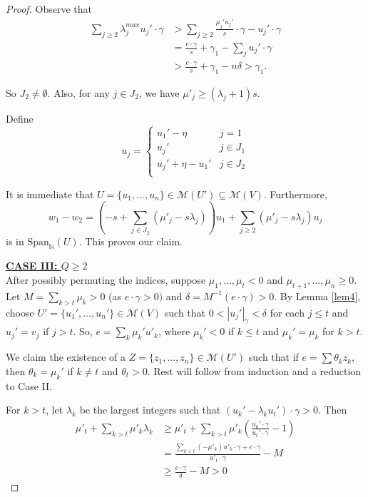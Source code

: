 \documentclass[10pt,a4paper]{amsart}
\newcommand{\N}{\mathbb{N}}
\newcommand{\cM}{\mathcal{M}}
\begin{document}
\begin{proof}
Observe that 
\begin{align*}
\sum_{j\geq 2} \lambda_j^{max}u_j'\cdot \gamma
    &> \sum_{j\geq 2} \frac{\mu_j'u_j'}{s}\cdot \gamma - u_j'\cdot \gamma \\
    &= \frac{e\cdot \gamma}{s} + \gamma_1 - \sum_j u_j'\cdot \gamma \\
    &> \frac{e\cdot \gamma}{s} + \gamma_1 - n\delta > \gamma_1.
\end{align*}

So $J_2\neq \emptyset$. Also, for any $j\in J_2$, we have $\mu'_j \geq (\lambda_j+1)s$.

Define
$$u_j = \begin{cases}
    u_1' -\eta & j=1 \\
    u_j' & j\in J_1\\
    u_j'+\eta - u_1' & j\in J_2 \\
\end{cases}$$

It is immediate that $U =\{u_1,\ldots, u_n\} \in \cM(U')\subseteq \cM(V)$. Furthermore, 
$$w_1 - w_2 = \left(-s+\sum_{j\in J_2} (\mu'_j  - s\lambda_j)\right)  u_1 +\sum_{j\geq 2} (\mu'_j  - s\lambda_j)u_j$$
is in $\mathrm{Span}_\N(U)$. This proves our claim.

\underline{\textbf{CASE III: $Q\geq 2$}} \\
After possibly permuting the indices, suppose $\mu_1,\ldots, \mu_t<0$ and $\mu_{t+1},\ldots, \mu_n\geq 0$. Let $M=\sum_{k>t}\mu_k>0$ (as $e\cdot \gamma>0)$ and $\delta = {M}^{-1}(e\cdot \gamma)>0$. By Lemma \ref{lem4}, choose $U'=\{u_1',\ldots,u_n'\}\in \cM(V)$ such that $0<|u_j'|_\gamma<\delta$ for each $j\leq t$ and $u_j'=v_j$ if $j>t$. So, $e = \sum_k \mu_k'u'_k$, where $\mu_k'<0$ if $k\leq t$ and $\mu_k'=\mu_k$ for $k>t$.

We claim the existence of a $Z =\{z_1,\ldots,z_n\} \in \cM(U')$ such that if 
$e = \sum \theta_k z_k$, then $\theta_k=\mu_k'$ if $k\neq t$ and $\theta_t > 0$. Rest will follow from induction and a reduction to Case II.

For $k>t$, let $\lambda_k$ be the largest integers such that $(u_k' - \lambda_k u_t')\cdot \gamma >0$. Then
\begin{align*}
    \mu'_t+\sum_{k>t} \mu'_k\lambda_k &\geq \mu'_t+\sum_{k>t} \mu'_k\left(\frac{u_k'\cdot \gamma}{u_t'\cdot \gamma}-1\right) \\
    &= \frac{\sum_{k<t} (-\mu'_k)u'_k\cdot \gamma + e\cdot \gamma }{u'_t\cdot \gamma} - M \\
    &\geq \frac{e\cdot \gamma}{\delta } - M > 0 
\end{align*}


\end{proof}
\end{document}
